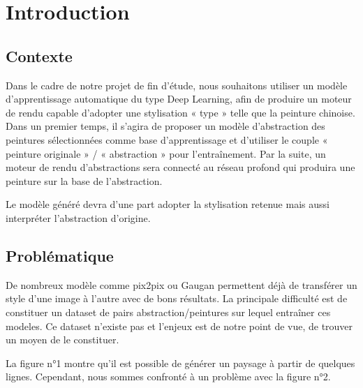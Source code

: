\documentclass[a4paper, 12pt]{book}
\begin{document}
\mainmatter
\chapter*{Introduction}

\section{Contexte}
Dans le cadre de notre projet de fin d'étude, nous souhaitons utiliser un modèle d’apprentissage automatique du type Deep Learning, afin de produire un moteur de rendu capable d’adopter une stylisation « type » telle que la peinture chinoise. Dans un premier temps, il s’agira de proposer un modèle d’abstraction des peintures sélectionnées comme base d’apprentissage et d’utiliser le couple « peinture originale » / « abstraction » pour l’entraînement. Par la suite, un moteur de rendu d’abstractions sera connecté au réseau profond qui produira une peinture sur la base de l’abstraction.

Le modèle généré devra d'une part adopter la stylisation retenue mais aussi interpréter l'abstraction d'origine.

\section{Problématique}

De nombreux modèle comme pix2pix ou Gaugan permettent déjà de transférer un style d'une image à l'autre avec de bons résultats. La principale difficulté est de constituer un dataset de pairs abstraction/peintures sur lequel entraîner ces modeles. Ce dataset n'existe pas et l'enjeux est de notre point de vue, de trouver un moyen de le constituer.

La figure n°1 montre qu'il est possible de générer un paysage à partir de quelques lignes. Cependant, nous sommes confronté à un problème avec la figure n°2.
\end{document}
